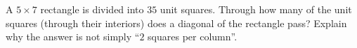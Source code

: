 A $5\times7$ rectangle is divided into $35$ unit squares. Through how many of the unit squares (through their interiors) does a diagonal of the rectangle pass? Explain why the answer is not simply ``$2$ squares per column''.
